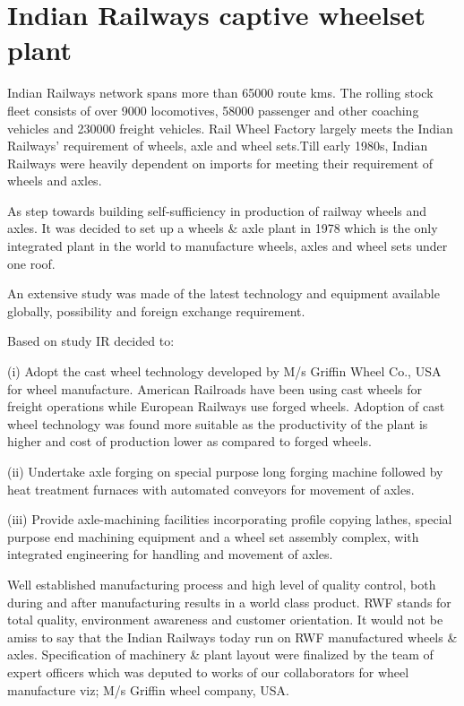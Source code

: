  \section{Indian Railways captive wheelset plant}
 Indian Railways network spans more than 65000 route kms. The rolling stock fleet    consists of over 9000 locomotives, 58000 passenger and other coaching vehicles and 230000 freight vehicles. Rail Wheel Factory largely meets the Indian Railways’ requirement of wheels, axle and wheel sets.Till early 1980s, Indian Railways were heavily dependent on imports for meeting their requirement of wheels and axles.

As step towards building self-sufficiency in production of railway wheels and axles. It was decided to set up a wheels \& axle plant in 1978 which is the only integrated plant in the world   to manufacture wheels, axles and wheel sets under one roof.

An extensive study was made of the latest technology and equipment available globally, possibility and foreign exchange requirement.

  
Based on study IR decided to:

(i) Adopt the cast wheel technology developed by M/s Griffin Wheel Co., USA for wheel manufacture. American Railroads have been using cast wheels for freight operations while European Railways use forged wheels. Adoption of cast wheel technology was found more suitable as the productivity of the plant is higher and cost of production lower as compared to forged wheels.




(ii) Undertake axle forging on special purpose long forging machine followed by heat treatment furnaces with automated conveyors for movement of axles.



(iii) Provide axle-machining facilities incorporating profile copying lathes, special purpose end machining equipment and a wheel set assembly complex, with integrated engineering for handling and movement of axles.




 Well established manufacturing process and high level of quality control, both during and after manufacturing results in a world class product. RWF stands for total quality, environment awareness and customer orientation. It would not be amiss to say that the Indian Railways today run on RWF manufactured wheels \& axles.
Specification of machinery \& plant layout were finalized by the team of expert officers which was deputed to works of our collaborators for wheel manufacture viz; M/s Griffin wheel company, USA.

